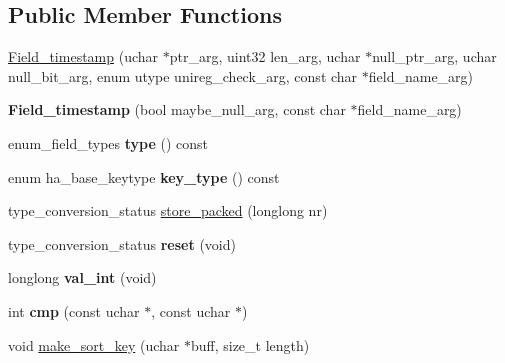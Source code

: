 \subsection*{Public Member Functions}
\begin{DoxyCompactItemize}
\item 
\mbox{\hyperlink{classField__timestamp_ad53b84d4e965c99d46bc897a099d17f6}{Field\+\_\+timestamp}} (uchar $\ast$ptr\+\_\+arg, uint32 len\+\_\+arg, uchar $\ast$null\+\_\+ptr\+\_\+arg, uchar null\+\_\+bit\+\_\+arg, enum utype unireg\+\_\+check\+\_\+arg, const char $\ast$field\+\_\+name\+\_\+arg)
\item 
\mbox{\label{classField__timestamp_a774b836f3f5a0f924573d0b8d4e3cab3}} 
{\bfseries Field\+\_\+timestamp} (bool maybe\+\_\+null\+\_\+arg, const char $\ast$field\+\_\+name\+\_\+arg)
\item 
\mbox{\label{classField__timestamp_a588d39bb93b40bec1d3467c4e16c8473}} 
enum\+\_\+field\+\_\+types {\bfseries type} () const
\item 
\mbox{\label{classField__timestamp_a056143d62e176dd4a496fe1da7107eba}} 
enum ha\+\_\+base\+\_\+keytype {\bfseries key\+\_\+type} () const
\item 
type\+\_\+conversion\+\_\+status \mbox{\hyperlink{classField__timestamp_aed9a6035937206a33864b8a6124791ee}{store\+\_\+packed}} (longlong nr)
\item 
\mbox{\label{classField__timestamp_aadc2c12437b0fdfbf4b69c4c80e04e6c}} 
type\+\_\+conversion\+\_\+status {\bfseries reset} (void)
\item 
\mbox{\label{classField__timestamp_a25098cfc9ddc1adeae65b02f097e0045}} 
longlong {\bfseries val\+\_\+int} (void)
\item 
\mbox{\label{classField__timestamp_af126398d2708b758dd04f9bc425e3964}} 
int {\bfseries cmp} (const uchar $\ast$, const uchar $\ast$)
\item 
void \mbox{\hyperlink{classField__timestamp_a8c456053320d0e56a49214a68d814aa4}{make\+\_\+sort\+\_\+key}} (uchar $\ast$buff, size\+\_\+t length)
\item 
\mbox{\label{classField__timestamp_a09e7508180c76c4468ffb3bc18492665}} 

\end{DoxyCompactItemize}
